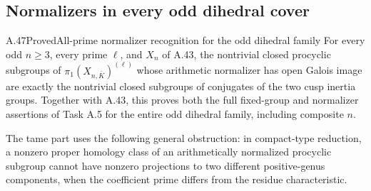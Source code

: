 \subsection{Normalizers in every odd dihedral cover}

\begin{statement}{A.47}{Proved}{All-prime normalizer recognition for the odd dihedral family}
For every odd \(n\ge3\), every prime \(\ell\), and
\(X_n\) of A.43, the nontrivial closed procyclic
subgroups of \(\pi_1(X_{n,\bar K})^{(\ell)}\)
whose arithmetic normalizer has open Galois image are
exactly the nontrivial closed subgroups of conjugates
of the two cusp inertia groups. Together with A.43,
this proves both the full fixed-group and normalizer
assertions of Task A.5 for the entire odd dihedral
family, including composite \(n\).

The tame part uses the following general obstruction:
in compact-type reduction, a nonzero proper homology
class of an arithmetically normalized procyclic subgroup
cannot have nonzero projections to two different
positive-genus components, when the coefficient prime
differs from the residue characteristic.
\end{statement}

